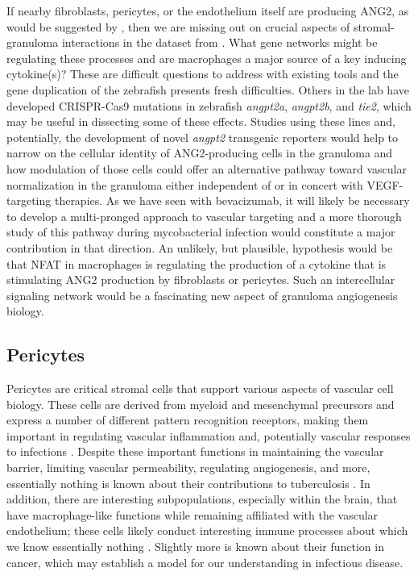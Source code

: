 If nearby fibroblasts, pericytes, or the endothelium itself are producing ANG2, as would be suggested by \citet{Gideon2022}, then we are missing out on crucial aspects of stromal-granuloma interactions in the dataset from \citet{Cronan2021}. What gene networks might be regulating these processes and are macrophages a major source of a key inducing cytokine(s)? These are difficult questions to address with existing tools and the gene duplication of the zebrafish presents fresh difficulties. Others in the lab have developed CRISPR-Cas9 mutations in zebrafish \textit{angpt2a}, \textit{angpt2b}, and \textit{tie2}, which may be useful in dissecting some of these effects. Studies using these lines and, potentially, the development of novel \textit{angpt2} transgenic reporters would help to narrow on the cellular identity of ANG2-producing cells in the granuloma and how modulation of those cells could offer an alternative pathway toward vascular normalization in the granuloma either independent of or in concert with VEGF-targeting therapies. As we have seen with bevacizumab, it will likely be necessary to develop a multi-pronged approach to vascular targeting and a more thorough study of this pathway during mycobacterial infection would constitute a major contribution in that direction. An unlikely, but plausible, hypothesis would be that NFAT in macrophages is regulating the production of a cytokine that is stimulating ANG2 production by fibroblasts or pericytes. Such an intercellular signaling network would be a fascinating new aspect of granuloma angiogenesis biology.

\subsection{Pericytes}

Pericytes are critical stromal cells that support various aspects of vascular cell biology. These cells are derived from myeloid and mesenchymal precursors and express a number of different pattern recognition receptors, making them important in regulating vascular inflammation and, potentially vascular responses to infections \citep{Yamazaki2018, Stark2013}. Despite these important functions in maintaining the vascular barrier, limiting vascular permeability, regulating angiogenesis, and more, essentially nothing is known about their contributions to tuberculosis \citep{Bergers2005}. In addition, there are interesting subpopulations, especially within the brain, that have macrophage-like functions while remaining affiliated with the vascular endothelium; these cells likely conduct interesting immune processes about which we know essentially nothing \citep{VeneroGalanternik2017, Balabanov1996}. Slightly more is known about their function in cancer, which may establish a model for our understanding in infectious disease.

